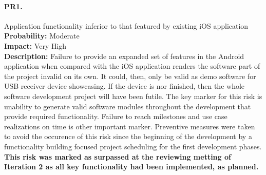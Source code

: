 		\paragraph{PR1.}Application functionality inferior to that featured by existing iOS application\\
		\textbf{Probability:} Moderate\\
		\textbf{Impact:} Very High\\
		\textbf{Description:} Failure to provide an expanded set of features in the Android application when compared with the iOS application renders the software part of the project invalid on its own. It could, then, only be valid as demo software for USB receiver device showcasing. If the device is nor finished, then the whole software development project will have been futile.
		The key marker for this risk is unability to generate valid software modules throughout the development that provide required functionality. Failure to reach milestones and use case realizations on time is other important marker.
		Preventive measures were taken to avoid the occurence of this risk since the beginning of the development by a functionality building focused project scheduling for the first development phases.\\
		\textbf{This risk was marked as surpassed at the reviewing metting of Iteration 2 as all key functionality had been implemented, as planned.}

